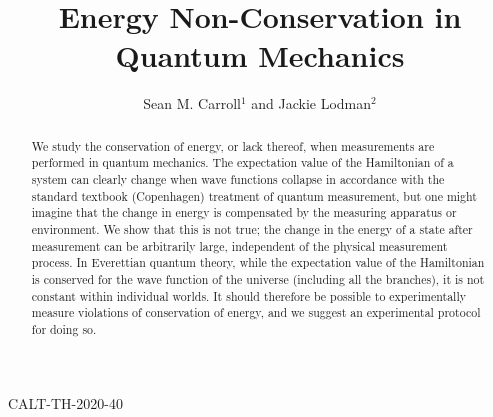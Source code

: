 \documentclass[12pt,aps,prd,onecolumn,nofootinbib,notitlepage]{revtex4-1}
\begin{document}
\hfill CALT-TH-2020-40
\hfill

\vspace{0.5cm}
\thispagestyle{empty}

\newcommand{\be}{\begin{equation}}
\newcommand{\ee}{\end{equation}}
\newcommand{\bea}{\begin{eqnarray}}
\newcommand{\eea}{\end{eqnarray}}
\newcommand{\hst}{\widetilde{\mathcal{H}}} 
\newcommand{\iso}{\dot{=}}
\newcommand{\Dim}{\mathrm{dim\,}}
\newcommand{\Tr}{\mathrm{Tr}}
\newcommand{\hs}{\mathcal{H}} 
\newcommand{\ham}{\widehat{H}}
\newcommand{\intham}{\widehat{H}_{\rm{int}}}
\newcommand{\selfham}{\widehat{H}_{\rm{self}}}
\def\bra#1{\langle #1\rvert}
\def\ket#1{\lvert #1\rangle}
\newcommand{\draftnote}[1]{\textbf{\color{red}[#1]}}
\newcommand{\psiuu}{\psi_{\uparrow\uparrow}}
\newcommand{\psiud}{\psi_{\uparrow\downarrow}}
\newcommand{\psidu}{\psi_{\downarrow\uparrow}}
\newcommand{\psidd}{\psi_{\downarrow\downarrow}}

\title{Energy Non-Conservation in Quantum Mechanics}
\author{Sean M. Carroll$^1$ and Jackie Lodman$^2$}

\begin{abstract}
We study the conservation of energy, or lack thereof, when measurements are performed in quantum mechanics.
The expectation value of the Hamiltonian of a system can clearly change when wave functions collapse in accordance with the standard textbook (Copenhagen) treatment of quantum measurement, but one might imagine that the change in energy is compensated by the measuring apparatus or environment.
We show that this is not true; the change in the energy of a state after measurement can be arbitrarily large, independent of the physical measurement process.
In Everettian quantum theory, while the expectation value of the Hamiltonian is conserved for the wave function of the universe (including all the branches), it is not constant within individual worlds.
It should therefore be possible to experimentally measure violations of conservation of energy, and we suggest an experimental protocol for doing so.
\end{abstract}
\end{document}
